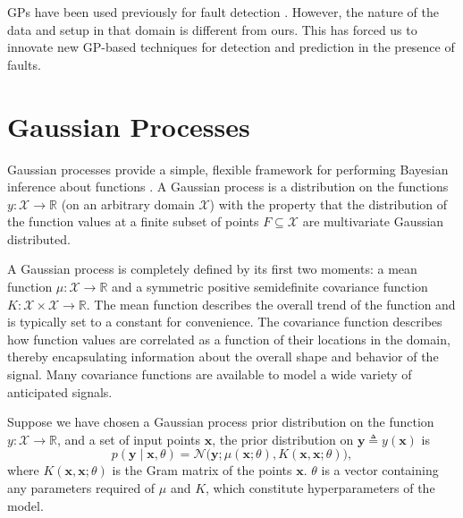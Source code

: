 \documentclass{article}
\newcommand{\R}{\ensuremath{\mathbb{R}}}
\newcommand{\deq}{\ensuremath{\triangleq}}
\newcommand{\given}{\ensuremath{\mid}}
\newcommand{\cm}[1]{\ensuremath{\mathcal{#1}}}
\newcommand{\bm}[1]{\ensuremath{\mathbf{#1}}}
\begin{document}
GPs have been used previously for fault detection \cite{Eciolaza2001}. However, the nature of the data and setup in that domain is different from ours. This has forced us to innovate new GP-based techniques for detection and prediction in the presence of faults.

\section{Gaussian Processes}
Gaussian processes provide a simple, flexible framework for
performing Bayesian inference about functions \cite{gpml}.  A
Gaussian process is a distribution on the functions
$y\colon \cm{X} \to \R$ (on an arbitrary domain $\cm{X}$) with the
property that the distribution of the function values at a finite
subset of points $F \subseteq \cm{X}$ are multivariate Gaussian
distributed.

A Gaussian process is completely defined by its first two moments: a
mean function $\mu\colon \cm{X} \to \R$ and a symmetric positive
semidefinite covariance function $K\colon \cm{X} \times \cm{X} \to
\R$.  The mean function describes the overall trend of the function
and is typically set to a constant for convenience.  The covariance
function describes how function values are correlated as a function of
their locations in the domain, thereby encapsulating information about
the overall shape and behavior of the signal.  Many covariance functions are available to model a wide variety of anticipated signals.

Suppose we have chosen a Gaussian process prior distribution
on the function $y\colon \cm{X} \to \R$,
and a set
of input points $\bm{x}$, the prior distribution on $\bm{y} \deq y(\bm{x})$ is
\begin{equation*}
 p(\bm{y} \given \bm{x}, \theta)
 =
 \cm{N}
 \bigl(
   \bm{y};
   \mu(\bm{x}; \theta),
   K(\bm{x}, \bm{x}; \theta)
 \bigr),
\end{equation*}
where $K(\bm{x}, \bm{x}; \theta)$ is the Gram matrix of the points
$\bm{x}$. $\theta$ is a vector containing any parameters required of $\mu$
and $K$, which constitute hyperparameters of the model. 
\end{document}
